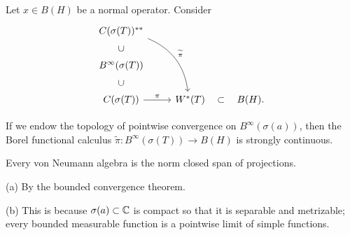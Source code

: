 \documentclass{../../large}
\begin{document}
\begin{prb}
Let $x\in B(H)$ be a normal operator.
Consider
\[\begin{tikzcd}
C(\sigma(T))^{**} \ar[bend left]{rdd}{\tilde\pi}&&\\
B^\infty(\sigma(T))\uar[phantom,sloped,"\subset"]&&\\
C(\sigma(T)) \ar{r}{\pi}\uar[phantom,sloped,"\subset"] & W^*(T)\rar[phantom,"\subset"]& B(H).
\end{tikzcd}\]
\begin{parts}
\item If we endow the topology of pointwise convergence on $B^\infty(\sigma(a))$, then the Borel functional calculus $\tilde\pi:B^\infty(\sigma(T))\to B(H)$ is strongly continuous.
\item Every von Neumann algebra is the norm closed span of projections.
\end{parts}
\end{prb}
\begin{pf}
(a)
By the bounded convergence theorem.

(b)
This is because $\sigma(a)\subset\mathbb{C}$ is compact so that it is separable and metrizable; every bounded measurable function is a pointwise limit of simple functions.
\end{pf}
\end{document}
